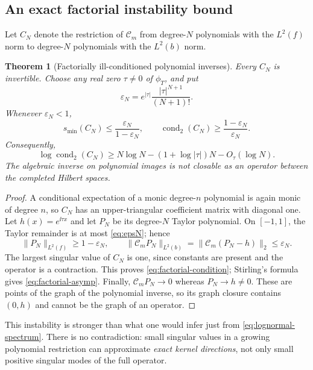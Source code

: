 \documentclass[11pt,a4paper]{article}
\numberwithin{equation}{section}
\newtheorem{theorem}{Theorem}[section]
\theoremstyle{definition}\newtheorem{definition}[theorem]{Definition}
\theoremstyle{remark}\newtheorem{remark}[theorem]{Remark}
\newcommand{\calC}{\mathcal C_m}\newcommand{\calP}{\mathcal P}
\newcommand{\norm}[1]{\lVert #1\rVert}
\begin{document}
\subsection{An exact factorial instability bound}
Let $C_N$ denote the restriction of $\calC$ from degree-$N$ polynomials with the $L^2(f)$ norm to degree-$N$ polynomials with the $L^2(b)$ norm.
\begin{theorem}[Factorially ill-conditioned polynomial inverses]
\label{thm:factorial}
Every $C_N$ is invertible. Choose any real zero $\tau\ne0$ of $\phi_T$, and put
\begin{equation}
 \varepsilon_N=e^{|\tau|}\frac{|\tau|^{N+1}}{(N+1)!}.
 \label{eq:epsN}
\end{equation}
Whenever $\varepsilon_N<1$,
\begin{equation}
 s_{\min}(C_N)\le\frac{\varepsilon_N}{1-\varepsilon_N},\qquad
 \operatorname{cond}_2(C_N)\ge\frac{1-\varepsilon_N}{\varepsilon_N}.
 \label{eq:factorial-condition}
\end{equation}
Consequently,
\begin{equation}
 \log\operatorname{cond}_2(C_N)
 \ge N\log N-(1+\log|\tau|)N-O_\tau(\log N).
 \label{eq:factorial-asymp}
\end{equation}
The algebraic inverse on polynomial images is not closable as an operator between the completed Hilbert spaces.
\end{theorem}
\begin{proof}
A conditional expectation of a monic degree-$n$ polynomial is again monic of degree $n$, so $C_N$ has an upper-triangular coefficient matrix with diagonal one. Let $h(x)=e^{\ii\tau x}$ and let $P_N$ be its degree-$N$ Taylor polynomial. On $[-1,1]$, the Taylor remainder is at most \eqref{eq:epsN}; hence
\[
 \norm{P_N}_{L^2(f)}\ge1-\varepsilon_N,
 \qquad \norm{\calC P_N}_{L^2(b)}
 =\norm{\calC(P_N-h)}_2\le\varepsilon_N.
\]
The largest singular value of $C_N$ is one, since constants are present and the operator is a contraction. This proves \eqref{eq:factorial-condition}; Stirling's formula gives \eqref{eq:factorial-asymp}. Finally, $\calC P_N\to0$ whereas $P_N\to h\ne0$. These are points of the graph of the polynomial inverse, so its graph closure contains $(0,h)$ and cannot be the graph of an operator.
\end{proof}
This instability is stronger than what one would infer just from \eqref{eq:lognormal-spectrum}. There is no contradiction: small singular values in a growing polynomial restriction can approximate \emph{exact kernel directions}, not only small positive singular modes of the full operator.
\end{document}
